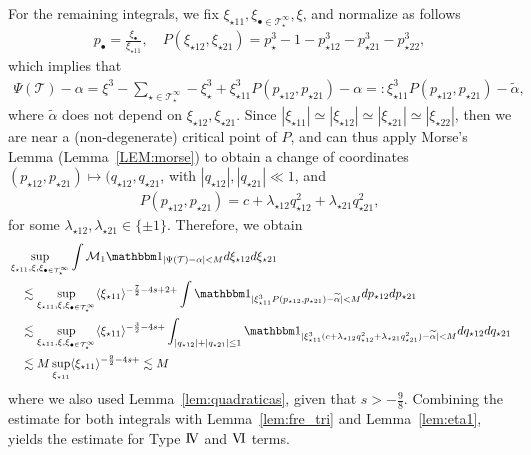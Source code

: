 \documentclass[%
11pt,  reqno]{amsart}
\newcommand{\IV}{\textup{I \hspace{-2.9mm} V}}
\newcommand{\5}{\textup{V}}
\newcommand{\VI}{\text{V\hspace{-1.6mm} I}}
\newcommand{\ind}{\mathbbm 1}
\newcommand{\les}{\lesssim}
\newcommand{\wt}{\widetilde}
\theoremstyle{remark}
\newcommand{\bul}{\bullet}
\newcommand{\TT}{\mathcal{T}}
\newcommand{\al}{\alpha}
\newcommand{\ld}{\lambda}
\newcommand{\jb}[1]
{\langle #1 \rangle}
\newcommand{\M}{\mathcal{M}}
\numberwithin{equation}{section}
\numberwithin{theorem}{section}
\begin{document}
For the remaining integrals, we fix $\xi_{\star11}, \xi_{\bul\in \TT^\infty_{\star}}, \xi$, and normalize as follows 
\begin{align}
    p_\bul = \frac{\xi_\bul}{\xi_{\star11}}, \quad P(\xi_{\star12}, \xi_{\star21}) = p^3_\star - 1 - p^3_{\star12} - p^3_{\star21} - p^3_{\star22}, 
\end{align}
which implies that
\begin{align}
    \Psi(\TT) - \al = \xi^3 - \sum_{\star \in \TT^\infty_\star} - \xi^3_\star + \xi^3_{\star11} P(p_{\star12}, p_{\star21}) - \al 
    =:
    \xi^3_{\star11} P(p_{\star12}, p_{\star21}) - \wt\al, 
\end{align}
where $\wt\al$ does not depend on $\xi_{\star12}, \xi_{\star21}$. Since $|\xi_{\star11}| \simeq |\xi_{\star12}| \simeq |\xi_{\star21}| \simeq |\xi_{\star22}|$, then we are near a (non-degenerate) critical point of $P$, and can thus apply Morse's Lemma (Lemma~\ref{LEM:morse}) to obtain a change of coordinates $(p_{\star12},p_{\star21}) \mapsto (q_{\star12}, q_{\star21}$, with $|q_{\star12}|, |q_{\star21}| \ll 1$, and 
\begin{align}
    P(p_{\star12}, p_{\star21}) = c + \ld_{\star12} q^2_{\star12} + \ld_{\star21} q_{\star21}^2, 
\end{align}
for some $\ld_{\star12},\ld_{\star21} \in \{\pm1\}$. Therefore, we obtain
\begin{align}
&
    \sup_{\xi_{\star11}, \xi, \xi_{\bul\in \TT^\infty_\star}
    }
    \int \M_1 \ind_{|\Psi(\TT) - \al | < M } d\xi_{\star12} d\xi_{\star21}
    \\
    &
    \quad 
    \les 
    \sup_{\xi_{\star11}, \xi, \xi_{\bul\in \TT^\infty_\star}
    }
    \jb{\xi_{\star11}}^{- \frac72 - 4s + 2 +}
    \int 
    \ind_{|\xi_{\star11}^3 P(p_{\star12}, p_{\star21}) - \wt\al | < M } dp_{\star12} dp_{\star21}
    \\
    &
    \quad 
    \les 
    \sup_{\xi_{\star11}, \xi, \xi_{\bul\in \TT^\infty_\star}
    }
    \jb{\xi_{\star11}}^{- \frac32 - 4s  +}
    \int_{|q_{\star12}| + |q_{\star21}| \le 1} \ind_{| \xi_{\star11}^3 (c + \ld_{\star12} q_{\star12}^2 + \ld_{\star21} q_{\star21}^2 ) - \wt\al | < M } dq_{\star12} dq_{\star21} 
    \\
    &
    \quad 
    \les 
    M
    \sup_{\xi_{\star11}} \jb{\xi_{\star11}}^{- \frac92 - 4s +}
    \les M 
\end{align}
where we also used Lemma~\ref{lem:quadraticas}, given that $s > - \frac98$. 
Combining the estimate for both integrals with Lemma~\ref{lem:fre_tri} and Lemma~\ref{lem:eta1}, yields the estimate for Type $\IV$ and $\VI$ terms.
\end{document}
